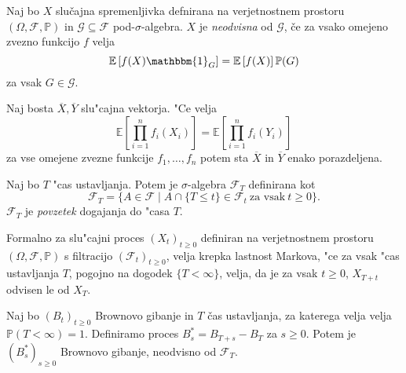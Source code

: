 \documentclass[twoside,11pt]{article}
\begin{document}
%

\begin{definicija}
    Naj bo $X$ slučajna spremenljivka defnirana na verjetnostnem prostoru $(\Omega, \mathcal{F}, \mathbb{P})$
    in $\mathcal{G} \subseteq \mathcal{F}$ pod-$\sigma$-algebra. $X$ je \textit{neodvisna}
    od $\mathcal{G}$, če za vsako omejeno zvezno funkcijo $f$ velja
    $$
        \mathbb{E}\left[f(X)\mathbbm{1}_G\right] = \mathbb{E}\left[f(X)\right]\mathbb{P}(G)
    $$
    za vsak $G \in \mathcal{G}$.
\end{definicija}

\begin{lema}
    Naj bosta $\overline{X}, \overline{Y} $ slu"cajna vektorja. "Ce velja 
    $$
        \mathbb{E}\left[\prod_{i=1}^n f_i(X_i)\right] = \mathbb{E}\left[\prod_{i=1}^n f_i(Y_i)\right]
    $$
    za vse omejene zvezne funkcije $f_1, \ldots, f_n$ potem sta $\overline{X}$ in $\overline{Y}$ enako porazdeljena.
    \label{lema:4}
\end{lema}

\begin{definicija}
    Naj bo $T$ "cas ustavljanja. Potem  je $\sigma$-algebra $\mathcal{F}_T$ definirana kot
    $$
        \mathcal{F}_T = \{A \in \mathcal{F} \mid A \cap \{T \leq t\} \in \mathcal{F}_t \ \text{za vsak} \ t\geq 0\}.
    $$
    $\mathcal{F}_T$ je \textit{povzetek} dogajanja do "casa $T$.
\end{definicija}

Formalno za slu"cajni proces $(X_t)_{t\geq0}$ definiran na verjetnostnem prostoru $(\Omega, \mathcal{F}, \mathbb{P})$ s filtracijo $(\mathcal{F}_t)_{t\geq0}$, velja
krepka lastnost Markova, "ce za vsak "cas ustavljanja $T$, pogojno na dogodek $\{T < \infty\}$, velja, da je za vsak $t \geq 0$,  $X_{T + t}$ odvisen le od $X_T$.

\begin{izrek}
    Naj bo $(B_t)_{t\geq 0}$ Brownovo gibanje in $T$ čas ustavljanja, za katerega velja velja $\mathbb{P}(T<\infty )=1$.
    Definiramo proces $B^*_s = B_{T + s} - B_T$ za $s\geq0$. Potem je $(B^*_s)_{s\geq0}$ Brownovo
    gibanje, neodvisno od $\mathcal{F}_T$.
\end{izrek}
\end{document}
